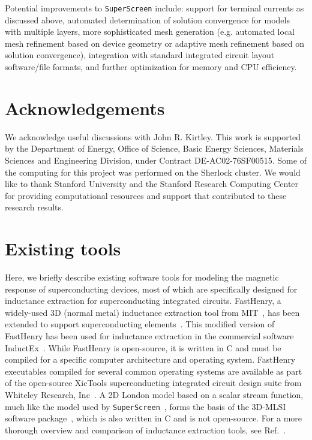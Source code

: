 \documentclass[final,3p,times,twocolumn]{elsarticle}
\newcommand{\inline}[1]{\texttt{#1}\xspace}
\newcommand{\SuperScreen}{\inline{SuperScreen}}
\begin{document}
Potential improvements to \SuperScreen include: support for terminal currents as discussed above, automated determination of solution convergence for models with multiple layers, more sophisticated mesh generation (e.g. automated local mesh refinement based on device geometry or adaptive mesh refinement based on solution convergence), integration with standard integrated circuit layout software/file formats, and further optimization for memory and CPU efficiency.

\section{Acknowledgements}
\label{section:acknowledgements}
We acknowledge useful discussions with John R. Kirtley. This work is supported by the Department of Energy,  Office of Science, Basic Energy Sciences, Materials Sciences and Engineering Division, under Contract DE-AC02-76SF00515. Some of the computing for this project was performed on the Sherlock cluster. We would like to thank Stanford University and the Stanford Research Computing Center for providing computational resources and support that contributed to these research results.




\appendix

\section{Existing tools}
\label{appendix:other-tools}

Here, we briefly describe existing software tools for modeling the magnetic response of superconducting devices, most of which are specifically designed for inductance extraction for superconducting integrated circuits. FastHenry, a widely-used 3D (normal metal) inductance extraction tool from MIT~\cite{Kamon1994-ck}, has been extended to support superconducting elements~\cite{wrcad, XicTools}. This modified version of FastHenry has been used for inductance extraction in the commercial software InductEx~\cite{Fourie2011-wl}. While FastHenry is open-source, it is written in C and must be compiled for a specific computer architecture and operating system. FastHenry executables compiled for several common operating systems are available as part of the open-source XicTools superconducting integrated circuit design suite from Whiteley Research, Inc~\cite{wrcad, XicTools}. A 2D London model based on a scalar stream function, much like the model used by \SuperScreen~\cite{Brandt2004-ew, Brandt2005-wj}, forms the basis of the 3D-MLSI software package~\cite{Khapaev1997-kw, Khapaev2001-xq, Khapaev2001-pw}, which is also written in C and is not open-source. For a more thorough overview and comparison of inductance extraction tools, see Ref.~\cite{Gaj1999-ls}.
\end{document}

